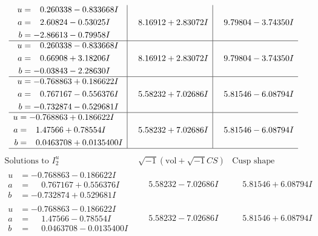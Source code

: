 \documentclass[1p]{elsarticle_modified}
\theoremstyle{definition}
\newcommand{\I}{\sqrt{-1}}
\begin{document}
$$\begin{array}{c|c|c}
\begin{aligned}
u &= \phantom{-}0.260338 - 0.833668 I \\
a &= \phantom{-}2.60824 - 0.53025 I \\
b &= -2.86613 - 0.79958 I\end{aligned}
 & \phantom{-}8.16912 + 2.83072 I & \phantom{-}9.79804 - 3.74350 I \\ \hline\begin{aligned}
u &= \phantom{-}0.260338 - 0.833668 I \\
a &= \phantom{-}0.66908 + 3.18206 I \\
b &= -0.03843 - 2.28630 I\end{aligned}
 & \phantom{-}8.16912 + 2.83072 I & \phantom{-}9.79804 - 3.74350 I \\ \hline\begin{aligned}
u &= -0.768863 + 0.186622 I \\
a &= \phantom{-}0.767167 - 0.556376 I \\
b &= -0.732874 - 0.529681 I\end{aligned}
 & \phantom{-}5.58232 + 7.02686 I & \phantom{-}5.81546 - 6.08794 I \\ \hline\begin{aligned}
u &= -0.768863 + 0.186622 I \\
a &= \phantom{-}1.47566 + 0.78554 I \\
b &= \phantom{-}0.0463708 + 0.0135400 I\end{aligned}
 & \phantom{-}5.58232 + 7.02686 I & \phantom{-}5.81546 - 6.08794 I\\
 \hline 
 \end{array}$$\newpage$$\begin{array}{c|c|c}  
\text{Solutions to }I^u_{2}& \I (\text{vol} + \sqrt{-1}CS) & \text{Cusp shape}\\
 \hline 
\begin{aligned}
u &= -0.768863 - 0.186622 I \\
a &= \phantom{-}0.767167 + 0.556376 I \\
b &= -0.732874 + 0.529681 I\end{aligned}
 & \phantom{-}5.58232 - 7.02686 I & \phantom{-}5.81546 + 6.08794 I \\ \hline\begin{aligned}
u &= -0.768863 - 0.186622 I \\
a &= \phantom{-}1.47566 - 0.78554 I \\
b &= \phantom{-}0.0463708 - 0.0135400 I\end{aligned}
 & \phantom{-}5.58232 - 7.02686 I & \phantom{-}5.81546 + 6.08794 I \\ \hline\begin{aligned}

\end{aligned}
\end{array}$$
\end{document}
